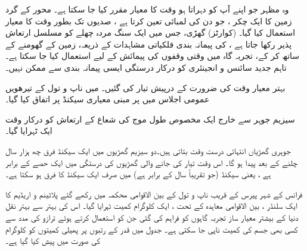  وہ  مظہر جو اپنے آپ کو دہراتا ہو وقت کا  معیار مقرر کیا جا سکتا ہے۔  محور کے گرد زمین کا ایک چکر ، جو دن کی لمبائی تعین کرتا ہے ، صدیوں تک بطور وقت کا  معیار  استعمال کیا گیا۔    (کوارٹز) گھڑی،  جس میں  ایک سنگ مردہ  چھلے  کو مسلسل ارتعاش پذیر رکھا جاتا ہے ، کی پیمانہ بندی فلکیاتی مشاہدات کے ذریعہ، زمین کے گھومنے کے ساتھ  کر کے،  تجربہ گاہ میں وقتی وقفوں کی پیمائش کے لیے  استعمال کیا جا سکتا ہے۔ تاہم جدید سائنس و انجینئری کو  درکار درستگی ایسی پیمانہ بندی  سے ممکن نہیں۔

بہتر معیار وقت کی ضرورت کے درپیش  تیار کی گئیں۔ میں ناپ و تول کے تیرھویں     عمومی اجلاس میں  پر مبنی معیاری سیکنڈ پر اتفاق کیا گیا۔


سیزیم   جوہر سے خارج ایک مخصوص طول موج کی شعاع کے   ارتعاش کو درکار وقت ایک  ٹہرایا گیا۔

جوہری گھڑیاں  انتہائی درست وقت بتاتی ہیں۔دو سیزیم گھڑیوں  میں ایک سیکنڈ فرق چھ ہزار سال چلنے کے بعد  پیدا ہو گا۔ اس وقت تیار کی جانے والی گھڑیوں کی درستگی    میں ایک حصے کے برابر ہے ، یعنی   سیکنڈ (جو تقریباً  سال  کے برابر ہے)  میں صرف ایک سیکنڈ کا فرق ہو سکتا ہے۔

فرانس کے شہر پیرس کے قریب ناپ و تول  کے بین الاقوامی محکمہ  میں رکھے گئے پلاٹینم و  اریڈیم کا ایک سلنڈر ، بین الاقوامی معاہدہ کے تحت ، ایک کلوگرام کمیت  ٹہرایا گیا۔ اس کی بہتر سے بہتر  نقل دنیا کے  بیشتر معیار ساز تجربہ گاہوں کو فراہم کی گئی  جن کو استعمال کرتے ہوئے ترازو کی مدد سے کسی بھی جسم کی کمیت ناپی جا سکتی ہے۔ جدول   میں   قدر کے   رتبوں پر پھیلی کمیتوں کو  کلوگرام کی صورت میں  پیش کیا گیا ہے۔

